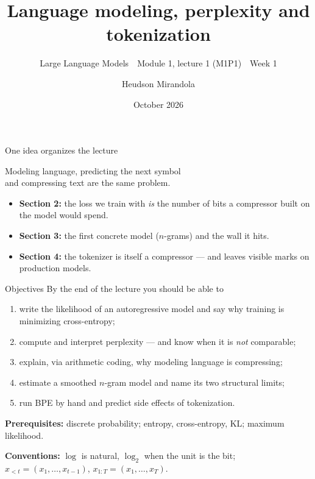 \documentclass[11pt,aspectratio=169]{beamer}
\title{Language modeling, perplexity and tokenization}
\subtitle{Large Language Models \,\textperiodcentered\, Module 1, lecture 1 (M1P1) \,\textperiodcentered\, Week 1}
\author{Heudson Mirandola}
\institute{Instituto de Matemática, UFRJ}
\date{October 2026}
\begin{document}
\begin{frame}[plain]
  \titlepage
\end{frame}

\begin{frame}{One idea organizes the lecture}
  \begin{block}{}
    \centering\Large
    Modeling language, predicting the next symbol\\ and compressing text are the same problem.
  \end{block}

  \vspace{1.2em}
  \begin{itemize}
    \item \textbf{Section 2:} the loss we train with \emph{is} the number of bits a compressor
          built on the model would spend.
    \item \textbf{Section 3:} the first concrete model ($n$-grams) and the wall it hits.
    \item \textbf{Section 4:} the tokenizer is itself a compressor --- and leaves visible
          marks on production models.
  \end{itemize}
\end{frame}

\begin{frame}{Objectives}
  By the end of the lecture you should be able to
  \begin{enumerate}
    \item write the likelihood of an autoregressive model and say why training is
          minimizing cross-entropy;
    \item compute and interpret perplexity --- and know when it is \emph{not} comparable;
    \item explain, via arithmetic coding, why modeling language is compressing;
    \item estimate a smoothed $n$-gram model and name its two structural limits;
    \item run BPE by hand and predict side effects of tokenization.
  \end{enumerate}

  \vspace{1em}
  \textbf{Prerequisites:} discrete probability; entropy, cross-entropy, KL; maximum likelihood.

  \textbf{Conventions:} $\log$ is natural, $\log_2$ when the unit is the bit;
  $x_{<t} = (x_1,\dots,x_{t-1})$, $x_{1:T} = (x_1,\dots,x_T)$.
\end{frame}
\end{document}
